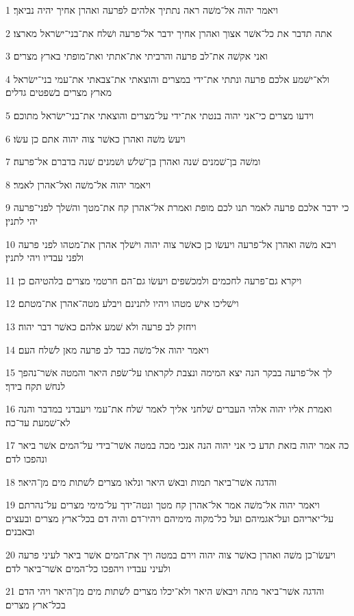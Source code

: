 \par 1 ויאמר יהוה אל־משׁה ראה נתתיך אלהים לפרעה ואהרן אחיך יהיה נביאך׃
\par 2 אתה תדבר את כל־אשׁר אצוך ואהרן אחיך ידבר אל־פרעה ושׁלח את־בני־ישׂראל מארצו׃
\par 3 ואני אקשׁה את־לב פרעה והרביתי את־אתתי ואת־מופתי בארץ מצרים׃
\par 4 ולא־ישׁמע אלכם פרעה ונתתי את־ידי במצרים והוצאתי את־צבאתי את־עמי בני־ישׂראל מארץ מצרים בשׁפטים גדלים׃
\par 5 וידעו מצרים כי־אני יהוה בנטתי את־ידי על־מצרים והוצאתי את־בני־ישׂראל מתוכם׃
\par 6 ויעשׂ משׁה ואהרן כאשׁר צוה יהוה אתם כן עשׂו׃
\par 7 ומשׁה בן־שׁמנים שׁנה ואהרן בן־שׁלשׁ ושׁמנים שׁנה בדברם אל־פרעה׃
\par 8 ויאמר יהוה אל־משׁה ואל־אהרן לאמר׃
\par 9 כי ידבר אלכם פרעה לאמר תנו לכם מופת ואמרת אל־אהרן קח את־מטך והשׁלך לפני־פרעה יהי לתנין׃
\par 10 ויבא משׁה ואהרן אל־פרעה ויעשׂו כן כאשׁר צוה יהוה וישׁלך אהרן את־מטהו לפני פרעה ולפני עבדיו ויהי לתנין׃
\par 11 ויקרא גם־פרעה לחכמים ולמכשׁפים ויעשׂו גם־הם חרטמי מצרים בלהטיהם כן׃
\par 12 וישׁליכו אישׁ מטהו ויהיו לתנינם ויבלע מטה־אהרן את־מטתם׃
\par 13 ויחזק לב פרעה ולא שׁמע אלהם כאשׁר דבר יהוה׃
\par 14 ויאמר יהוה אל־משׁה כבד לב פרעה מאן לשׁלח העם׃
\par 15 לך אל־פרעה בבקר הנה יצא המימה ונצבת לקראתו על־שׂפת היאר והמטה אשׁר־נהפך לנחשׁ תקח בידך׃
\par 16 ואמרת אליו יהוה אלהי העברים שׁלחני אליך לאמר שׁלח את־עמי ויעבדני במדבר והנה לא־שׁמעת עד־כה׃
\par 17 כה אמר יהוה בזאת תדע כי אני יהוה הנה אנכי מכה במטה אשׁר־בידי על־המים אשׁר ביאר ונהפכו לדם׃
\par 18 והדגה אשׁר־ביאר תמות ובאשׁ היאר ונלאו מצרים לשׁתות מים מן־היאר׃
\par 19 ויאמר יהוה אל־משׁה אמר אל־אהרן קח מטך ונטה־ידך על־מימי מצרים על־נהרתם על־יאריהם ועל־אגמיהם ועל כל־מקוה מימיהם ויהיו־דם והיה דם בכל־ארץ מצרים ובעצים ובאבנים׃
\par 20 ויעשׂו־כן משׁה ואהרן כאשׁר צוה יהוה וירם במטה ויך את־המים אשׁר ביאר לעיני פרעה ולעיני עבדיו ויהפכו כל־המים אשׁר־ביאר לדם׃
\par 21 והדגה אשׁר־ביאר מתה ויבאשׁ היאר ולא־יכלו מצרים לשׁתות מים מן־היאר ויהי הדם בכל־ארץ מצרים׃

